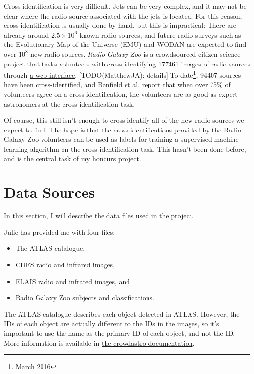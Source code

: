 \documentclass[a4paper]{article}
\begin{document}
        Cross-identification is very difficult. Jets can be very complex, and it may not be clear where the radio source associated with the jets is located. For this reason, cross-identification is usually done by hand\cite{banfield15}, but this is impractical: There are already around $2.5 \times 10^6$ known radio sources, and future radio surveys such as the Evolutionary Map of the Universe (EMU)\cite{norris11} and WODAN\cite{röttgering11} are expected to find over $10^8$ new radio sources\cite{banfield15}. \emph{Radio Galaxy Zoo} is a crowdsourced citizen science project that tasks volunteers with cross-identifying 177461 images of radio sources through \href{http://radio.galaxyzoo.org}{a web interface}. [TODO(MatthewJA): details] To date\footnote{March 2016}, 94407 sources have been cross-identified, and Banfield et al.\cite{banfield15} report that when over 75\% of volunteers agree on a cross-identification, the volunteers are as good as expert astronomers at the cross-identification task.

        Of course, this still isn't enough to cross-identify all of the new radio sources we expect to find. The hope is that the cross-identifications provided by the Radio Galaxy Zoo volunteers can be used as labels for training a supervised machine learning algorithm on the cross-identification task. This hasn't been done before, and is the central task of my honours project.

    \section{Data Sources}

        In this section, I will describe the data files used in the project.

        Julie has provided me with four files:
        \begin{itemize}
            \item The ATLAS catalogue,
            \item CDFS radio and infrared images,
            \item ELAIS radio and infrared images, and
            \item Radio Galaxy Zoo subjects and classifications.
        \end{itemize}

        The ATLAS catalogue describes each object detected in ATLAS. However, the IDs of each object are actually different to the IDs in the images, so it's important to use the name as the primary ID of each object, and not the ID. More information is available in \href{https://github.com/chengsoonong/crowdastro/blob/master/docs/datasets/atlas.md}{the crowdastro documentation}.
\end{document}
